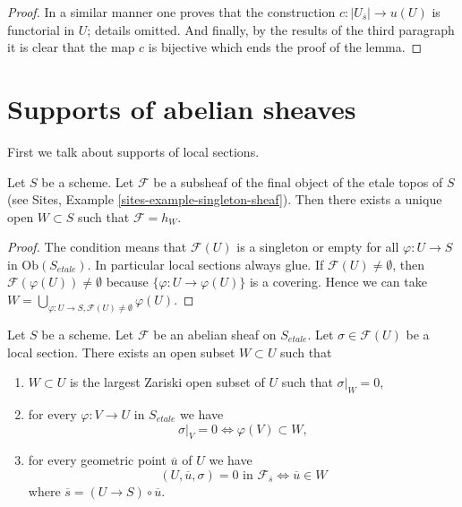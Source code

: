 \begin{proof}
\medskip\noindent
In a similar manner one proves that the construction
$c : |U_{\overline{s}}| \to u(U)$ is functorial in $U$;
details omitted. And finally, by the results of the
third paragraph it is clear that the map $c$ is bijective
which ends the proof of the lemma.
\end{proof}














\section{Supports of abelian sheaves}
\label{section-support}

\noindent
First we talk about supports of local sections.

\begin{lemma}
\label{lemma-support-subsheaf-final}
Let $S$ be a scheme. Let $\mathcal{F}$ be a subsheaf of the final
object of the etale topos of $S$ (see
Sites, Example \ref{sites-example-singleton-sheaf}).
Then there exists a unique open
$W \subset S$ such that $\mathcal{F} = h_W$.
\end{lemma}

\begin{proof}
The condition means that $\mathcal{F}(U)$ is a singleton or
empty for all $\varphi : U \to S$ in $\text{Ob}(S_{etale})$.
In particular local sections always glue. If
$\mathcal{F}(U) \not = \emptyset$, then
$\mathcal{F}(\varphi(U)) \not = \emptyset$ because
$\{\varphi : U \to \varphi(U)\}$ is a covering.
Hence we can take
$W = \bigcup_{\varphi : U \to S, \mathcal{F}(U) \not = \emptyset} \varphi(U)$.
\end{proof}

\begin{lemma}
\label{lemma-zero-over-image}
Let $S$ be a scheme.
Let $\mathcal{F}$ be an abelian sheaf on $S_{etale}$.
Let $\sigma \in \mathcal{F}(U)$ be a local section.
There exists an open subset $W \subset U$ such that
\begin{enumerate}
\item $W \subset U$ is the largest Zariski open subset of $U$ such
that $\sigma|_W = 0$,
\item for every $\varphi : V \to U$ in $S_{etale}$ we have
$$
\sigma|_V = 0 \Leftrightarrow \varphi(V) \subset W,
$$
\item for every geometric point $\overline{u}$ of $U$ we have
$$
(U, \overline{u}, \sigma) = 0\text{ in }\mathcal{F}_{\overline{s}}
\Leftrightarrow
\overline{u} \in W
$$
where $\overline{s} = (U \to S) \circ \overline{u}$.
\end{enumerate}
\end{lemma}

